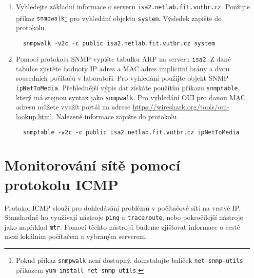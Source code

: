 \documentclass[a4paper,11pt]{article}
\begin{document}
\begin{enumerate}
\item Vyhledejte základní informace o serveru {\tt isa2.netlab.fit.vutbr.cz}.  Použijte příkaz {\tt snmpwalk}\footnote{Pokud příkaz {\tt snmpwalk} není dostupný, doinstalujte balíček \texttt{net-snmp-utils} příkazem \texttt{yum install net-snmp-utils}.} pro vyhledání objektu \texttt{system}. %
  Výsledek zapište do protokolu. 
\begin{verbatim}
  snmpwalk -v2c -c public isa2.netlab.fit.vutbr.cz system
\end{verbatim}
\item Pomocí protokolu SNMP vypište tabulku ARP na serveru {\tt isa2}. Z dané tabulce zjistěte  hodnoty IP adres a MAC adres implicitní brány a dvou sousedních počítačů v laboratoři. Pro vyhledání použijte objekt SNMP \texttt{ipNetToMedia}. Přehlednější výpis dat získáte použitím příkazu \texttt{snmptable}, který má stejnou syntax jako \texttt{snmpwalk}. Pro vyhledání OUI pro danou MAC adresu můžete využít portál na adrese \url{https://wireshark.org/tools/oui-lookup.html}. Nalezené informace zapište do protokolu. 
\begin{verbatim}
  snmptable -v2c -c public isa2.netlab.fit.vutbr.cz ipNetToMedia
\end{verbatim}
\end{enumerate}

\section{Monitorování sítě pomocí protokolu ICMP}
Protokol ICMP slouží pro dohledávání problémů v počítačové síti na vrstvě IP. Standardně ho využívají nástroje \texttt{ping} a \texttt{traceroute}, nebo pokročilejší nástroje jako například \texttt{mtr}. Pomocí těchto nástrojů budeme zjišťovat informace o cestě mezi lokálním počítačem a vybraným serverem.
\end{document}
